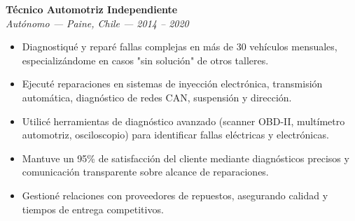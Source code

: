 \documentclass[10pt,letterpaper]{article}
\begin{document}
\vspace{0.2cm}

\noindent \textbf{Técnico Automotriz Independiente} \\
\textit{Autónomo — Paine, Chile — 2014 – 2020}
\begin{itemize}
    \item Diagnostiqué y reparé fallas complejas en más de 30 vehículos mensuales, especializándome en casos "sin solución" de otros talleres.
    \item Ejecuté reparaciones en sistemas de inyección electrónica, transmisión automática, diagnóstico de redes CAN, suspensión y dirección.
    \item Utilicé herramientas de diagnóstico avanzado (scanner OBD-II, multímetro automotriz, osciloscopio) para identificar fallas eléctricas y electrónicas.
    \item Mantuve un 95\% de satisfacción del cliente mediante diagnósticos precisos y comunicación transparente sobre alcance de reparaciones.
    \item Gestioné relaciones con proveedores de repuestos, asegurando calidad y tiempos de entrega competitivos.
\end{itemize}

\vspace{0.4cm}

\vspace{0.3cm}
\end{document}
